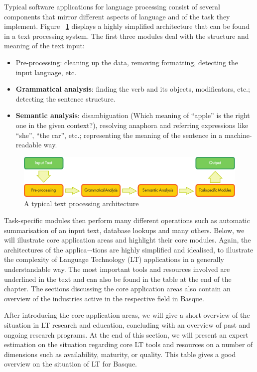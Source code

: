 \begin{multicols}{2}
    Typical software applications for language processing consist of several components that mirror different aspects of language and of the task they implement. Figure ~\ref{fig:textprocessingarch_en} displays a highly simplified architecture that can be found in a text processing system. The first three modules deal with the structure and meaning of the text input:
    \begin{itemize}
      \item Pre-processing: cleaning up the data, removing formatting, detecting the input language, etc. 
      \item \textbf{Grammatical analysis}: finding the verb and its objects, modificators, etc.; detecting the sentence structure.
      \item \textbf{Semantic analysis}: disambiguation (Which meaning of “apple” is the right one in the given context?), resolving anaphora and referring expressions like “she”, “the car”, etc.; representing the meaning of the sentence in a machine-readable way.
\end{itemize}
\begin{figure}[b]
  \center
  \includegraphics[width=\textwidth]{../_media/english/text_processing_app_architecture}
  \caption{A typical text processing architecture}
  \label{fig:textprocessingarch_en}
\end{figure}
   
 Task-specific modules then perform many different operations such as automatic summarisation of an input text, database lookups and many others. Below, we will illustrate core application areas and highlight their core modules. Again, the architectures of the applica¬tions are highly simplified and idealised, to illustrate the complexity of Language Technology (LT) applications in a generally understandable way. The most important tools and resources involved are underlined in the text and can also be found in the table at the end of the chapter.  The sections discussing the core application areas also contain an overview of the industries active in the respective field in Basque.

After introducing the core application areas, we will give a short overview of the situation in LT research and education, concluding with an overview of past and ongoing research programs. At the end of this section, we will present an expert estimation on the situation regarding core LT tools and resources on a number of dimensions such as availability, maturity, or quality. This table gives a good overview on the situation of LT for Basque.


\end{multicols}
